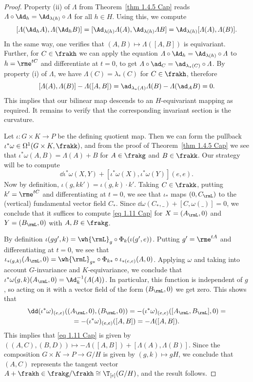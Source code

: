 \begin{proof}
    Property (ii) of $\varLambda$ from Theorem~\ref{thm 1.4.5 Cap} reads $\varLambda\circ\Ad_h=\Ad_{\lambda(h)}\circ\varLambda$ for all $h\in H$. Using this, we compute 
    \[[\varLambda(\Ad_h A),\varLambda(\Ad_h B)]=[\Ad_{\lambda(h)}\varLambda(A),\Ad_{\lambda(h)}\varLambda B]=\Ad_{\lambda(h)}[\varLambda(A),\varLambda(B)].\]
    In the same way, one verifies that $(A,B)\mapsto \varLambda([A,B])$ is equivariant. Further, for $C\in\frakh$ we can apply the equation $\varLambda\circ \Ad_h=\Ad_{\lambda(h)}\circ \varLambda$ to $h=\rme^{tC}$ and differentiate at $t=0$, to get $\varLambda\circ\ad_C=\ad_{\lambda_\ast(C)}\circ\varLambda$. By property (i) of $\varLambda$, we have $\varLambda(C)=\lambda_\ast(C)$ for $C\in\frakh$, therefore 
    \[[\varLambda(A),\varLambda(B)]-\varLambda([A,B])=\ad_{\lambda_\ast(A)}\varLambda(B)-\varLambda(\ad_A B)=0.\]
    This implies that our bilinear map descends to an $H$-equivariant mapping as required. It remains to verify that the corresponding invariant section is the curvature.

    Let $\iota:G\times K\to P$ be the defining quotient map. Then we can form the pullback $\iota^\ast\omega\in\Omega^1(G\times K,\frakk)$, and from the proof of Theorem~\ref{thm 1.4.5 Cap} we see that $\iota^\ast\omega(A,B)=\varLambda(A)+B$ for $A\in\frakg$ and $B\in\frakk$. Our strategy will be to compute 
    \[\dd\iota^\ast\omega(X,Y)+[\iota^\ast\omega(X),\iota^\ast\omega(Y)](e,e).\label{eq 1.11 Cap}\]
    Now by definition, $\iota(g,kk')=\iota(g,k)\cdot k'$. Taking $C\in\frakk$, putting $k'=\rme^{tC}$ and differentiating at $t=0$, we see that $\iota_\ast$ maps $(0,C_\rmL)$ to the (vertical) fundamental vector field $C_\ast$. Since $\dd\omega(C_\ast,\_)+[C,\omega(\_)]=0$, we conclude that it suffices to compute \eqref{eq 1.11 Cap} for $X=(A_\rmL,0)$ and $Y=(B_\rmL,0)$ with $A,B\in\frakg$.

    By definition $\iota(gg',k)=\wh{\rmL}_g\circ \Phi_k(\iota(g',e))$. Putting $g'=\rme^{tA}$ and differentiating at $t=0$, we see that $\iota_{\ast(g,k)}(A_\rmL,0)=\wh{\rmL}_{g\ast}\circ \Phi_{k\ast}\circ \iota_{\ast(e,e)}(A,0)$. Applying $\omega$ and taking into account $G$-invariance and $K$-equivariance, we conclude that $\iota^\ast\omega(g,k)(A_\rmL,0)=\Ad_k^{-1}(\varLambda(A))$. In particular, this function is independent of $g$, so acting on it with a vector field of the form $(B_\rmL,0)$ we get zero. This shows that
    \begin{multline}
        \dd(\iota^\ast\omega)_{(e,e)}((A_\rmL,0),(B_\rmL,0))=-(\iota^\ast\omega)_{(e,e)}([A_\rmL,B_\rmL],0)=\\
        =-(\iota^\ast \omega)_{(e,e)}([A,B])=-\varLambda([A,B]).
    \end{multline}
    This implies that \eqref{eq 1.11 Cap} is given by $((A,C),(B,D))\mapsto -\varLambda([A,B])+[\varLambda(A),\varLambda(B)]$. Since the composition $G\times K\to P\to G\slash H$ is given by $(g,k)\mapsto gH$, we conclude that $(A,C)$ represents the tangent vector $A+\frakh\in\frakg\slash\frakh\cong \T_{[e]}(G\slash H)$, and the result follows.
\end{proof}

